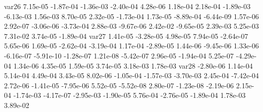 var26  7.15e-05 -1.87e-04 -1.36e-03 -2.40e-04  4.28e-06  1.18e-04  2.18e-04 -1.89e-03 -6.13e-03  1.56e-03  8.70e-05  2.32e-05 -1.73e-04  1.73e-05 -8.89e-04 -6.44e-09  1.57e-06  2.92e-07 -3.06e-06 -3.73e-04  2.88e-03 -9.67e-06  2.42e-02 -9.65e-05  2.39e-03  5.25e-03  7.31e-02  3.74e-05 -1.89e-04
var27  1.41e-05 -3.28e-05  4.98e-05  7.94e-05 -2.64e-07  5.65e-06  1.69e-05 -2.62e-04 -3.19e-04  1.17e-04 -2.89e-05  1.44e-06 -9.45e-06  1.33e-06 -6.16e-07 -5.91e-10 -1.28e-07  1.21e-08 -5.42e-07  2.96e-05 -1.94e-04  5.25e-07 -4.29e-04  1.34e-06  4.35e-05  1.59e-05  3.74e-05  3.18e-03  1.78e-03
var28 -2.80e-06  1.14e-04  5.14e-04  4.49e-04  3.43e-05  8.02e-06 -1.05e-04 -1.57e-03 -3.70e-03  2.45e-04 -7.42e-04  2.72e-06 -1.41e-05 -7.95e-06  5.52e-05 -5.52e-08  2.80e-07 -1.23e-08 -2.19e-06  2.15e-04 -1.74e-03 -4.17e-07 -2.95e-03 -1.90e-05  5.76e-04 -2.76e-05 -1.89e-04  1.78e-03  3.89e-02


